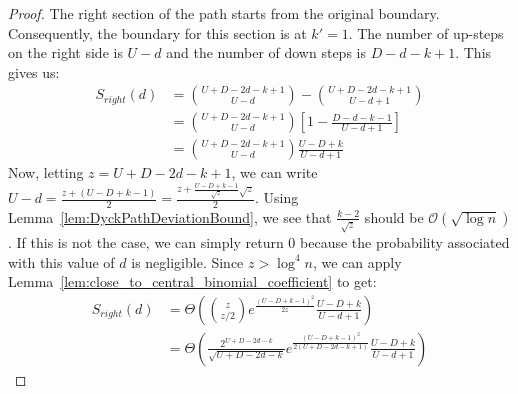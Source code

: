 \ReturnDRightBound*
\begin{proof}
The right section of the path starts from the original boundary.
Consequently, the boundary for this section is at $k' = 1$.
The number of up-steps on the right side is $U-d$ and the number of down steps is $D-d-k+1$.
This gives us:
\begin{align}
S_{right}(d) &= \binom{U+D-2d-k+1}{U-d} - \binom{U+D-2d-k+1}{U-d+1}\\
&= \binom{U+D-2d-k+1}{U-d}\left[ 1-\frac{D-d-k-1}{U-d+1}\right]\\
&= \binom{U+D-2d-k+1}{U-d}\frac{U-D+k}{U-d+1}
\end{align}
Now, letting $z = U+D-2d-k+1$,  we can write $U-d = \frac{z+(U-D+k-1)}{2} = \frac{z+\frac{U-D+k-1}{\sqrt z}\sqrt z}{2}$.
Using Lemma~\ref{lem:DyckPathDeviationBound}, we see that $\frac{k-2}{\sqrt z}$ should be $\mathcal O(\sqrt{\log n})$.
If this is not the case, we can simply return $0$ because the probability associated with this value of $d$ is negligible.
Since $z > \log^4 n$, we can apply Lemma~\ref{lem:close_to_central_binomial_coefficient} to get:
\begin{align}
S_{right}(d) &= \Theta\left( \binom{z}{z/2} e^{\frac{(U-D+k-1)^2}{2z}} \frac{U-D+k}{U-d+1} \right)\\
&= \Theta\left( \frac{2^{U+D-2d-k}}{\sqrt{U+D-2d-k}} e^{\frac{(U-D+k-1)^2}{2(U+D-2d-k+1)}} \frac{U-D+k}{U-d+1} \right)
\end{align}
\end{proof}
